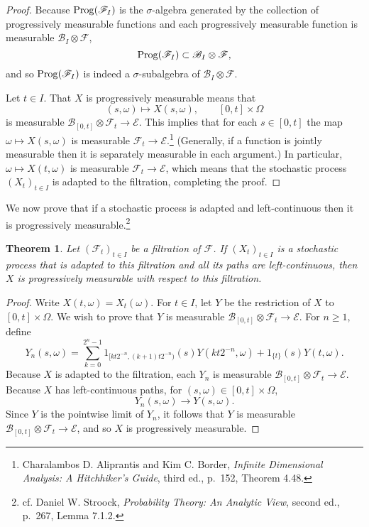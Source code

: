 \documentclass{article}
\newcommand{\Prog}{\ensuremath\mathrm{Prog}}
\theoremstyle{plain}
\newtheorem{theorem}{Theorem}
\theoremstyle{definition}
\begin{document}
\begin{proof}
Because $\Prog(\mathscr{F}_I)$ is the $\sigma$-algebra generated by the collection
of progressively measurable functions and each progressively measurable function is measurable
$\mathscr{B}_I \otimes \mathscr{F}$, 
\[
\Prog(\mathscr{F}_I) \subset \mathscr{B}_I \otimes \mathscr{F},
\]
and so $\Prog(\mathscr{F}_I)$ is indeed a $\sigma$-subalgebra of $\mathscr{B}_I \otimes \mathscr{F}$. 

Let $t \in I$. That $X$ is progressively measurable means that 
\[
(s,\omega) \mapsto X(s,\omega), \qquad [0,t] \times \Omega
\]
is measurable $\mathscr{B}_{[0,t]} \otimes \mathscr{F}_t \to \mathscr{E}$. This implies that for each $s \in [0,t]$ the map
$\omega \mapsto X(s,\omega)$ is measurable $\mathscr{F}_t \to \mathscr{E}$.\footnote{Charalambos D. Aliprantis and Kim C. Border, {\em Infinite Dimensional Analysis:
A Hitchhiker's Guide}, third ed., p.~152, Theorem 4.48.} (Generally, if a function is jointly measurable then it is separately measurable in each argument.)
In particular, $\omega \mapsto X(t,\omega)$ is measurable $\mathscr{F}_t \to \mathscr{E}$, which means that the stochastic process $(X_t)_{t \in I}$ is adapted
to the filtration, completing the proof.
\end{proof}


We now prove that if a stochastic process is adapted and left-continuous then it is progressively
measurable.\footnote{cf. Daniel W. Stroock, {\em Probability Theory: An Analytic View}, second ed.,
p.~267, Lemma 7.1.2.}

\begin{theorem}
Let $(\mathscr{F}_t)_{t \in I}$ be a filtration of $\mathscr{F}$. If $(X_t)_{t \in I}$ is a stochastic
process that is adapted to this filtration and all its paths are left-continuous, then $X$ is progressively measurable with respect to this filtration.
\end{theorem}
\begin{proof}
Write $X(t,\omega)=X_t(\omega)$. 
For $t \in I$,
let $Y$ be the restriction of $X$ to $[0,t] \times \Omega$. We wish to prove that $Y$ is measurable
$\mathscr{B}_{[0,t]} \otimes \mathscr{F}_t \to \mathscr{E}$. 
For $n \geq 1$, define
\[
Y_n(s,\omega) = \sum_{k=0}^{2^n-1} 1_{[kt2^{-n},(k+1)t2^{-n})}(s) Y(kt2^{-n},\omega)
+1_{\{t\}}(s) Y(t,\omega).
\]
Because $X$ is adapted to the filtration,
each $Y_n$ is measurable $\mathscr{B}_{[0,t]} \otimes \mathscr{F}_t \to \mathscr{E}$.
Because $X$ has left-continuous paths, for $(s,\omega) \in [0,t] \times \Omega$,
\[
Y_n(s,\omega) \to Y(s,\omega). 
\]
Since $Y$ is the pointwise limit of $Y_n$, it follows that $Y$ is measurable $\mathscr{B}_{[0,t]} \otimes \mathscr{F}_t \to \mathscr{E}$,
and so $X$ is progressively measurable.
\end{proof}
\end{document}
